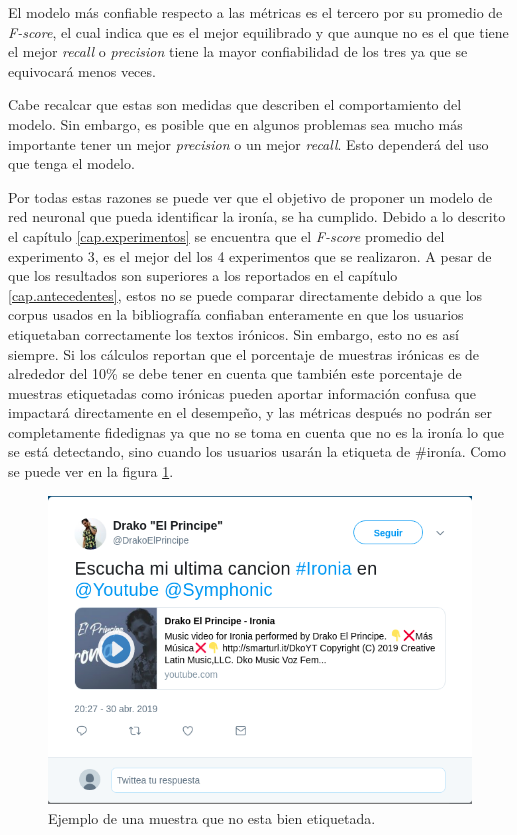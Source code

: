 \par El modelo más confiable respecto a las métricas es el tercero por su  promedio de \textit{F-score}, el cual indica que es el mejor equilibrado y que aunque  no es el que tiene el mejor \textit{recall} o \textit{precision} tiene la mayor confiabilidad de los tres ya que se equivocará menos veces.

\par Cabe recalcar que estas son medidas que describen el comportamiento del modelo. Sin embargo, es posible que en algunos problemas sea mucho más importante tener un mejor \textit{precision} o un mejor \textit{recall}. Esto dependerá del uso que tenga el modelo.

\par Por todas estas razones se puede ver que el objetivo de proponer un modelo de red neuronal que pueda identificar la ironía, se ha cumplido. Debido a lo descrito el capítulo \ref{cap.experimentos} se encuentra que el \textit{F-score} promedio del experimento 3, es el mejor del los 4 experimentos que se realizaron. A pesar de que los resultados son superiores a los reportados en el capítulo \ref{cap.antecedentes}, estos no se puede comparar directamente debido a que los corpus usados en la bibliografía confiaban enteramente en que los usuarios etiquetaban correctamente los textos irónicos. Sin embargo, esto no es así siempre. Si los cálculos reportan que el porcentaje de muestras irónicas es de alrededor del 10\% se debe tener en cuenta que también este porcentaje de muestras etiquetadas como irónicas pueden aportar información confusa que impactará directamente en el desempeño, y las métricas después no podrán ser completamente fidedignas ya que no se toma en cuenta que no es la ironía lo que se está detectando, sino cuando los usuarios usarán la etiqueta de \#ironía. Como se puede ver en la figura \ref{fig:ejemploNoironia}.
\begin{figure}
	\centering
	\includegraphics[width=\linewidth]{imagenes/ejemploIroniaNoironia.png}
	\caption{Ejemplo de una muestra que no esta bien etiquetada.}
	\label{fig:ejemploNoironia}
\end{figure}


